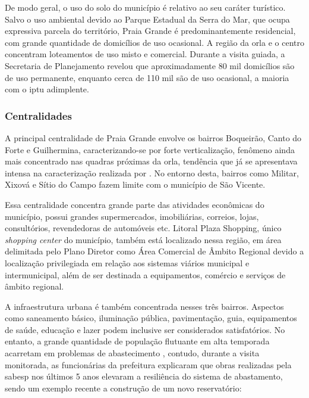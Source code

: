 	De modo geral, o uso do solo do município é relativo ao seu caráter turístico. Salvo o uso ambiental devido ao Parque Estadual da Serra do Mar, que ocupa expressiva parcela do território, Praia Grande é predominantemente residencial, com grande quantidade de domicílios de uso ocasional. A região da orla e o centro concentram loteamentos de uso misto e comercial. Durante a visita guiada, a Secretaria de Planejamento revelou que aproximadamente 80 mil domicílios são de uso permanente, enquanto cerca de 110 mil são de uso ocasional, a maioria com o \gls{iptu} adimplente.
	
	\subsubsection{Centralidades}
	A principal centralidade de Praia Grande envolve os bairros Boqueirão, Canto do Forte e Guilhermina, caracterizando-se por forte verticalização, fenômeno ainda mais concentrado nas quadras próximas da orla, tendência que já se apresentava intensa na caracterização realizada por \cite{agem2015a}. No entorno desta, bairros como Militar, Xixová e Sítio do Campo fazem limite com o município de São Vicente.
	
	Essa centralidade concentra grande parte das atividades econômicas do município, possui grandes supermercados, imobiliárias, correios, lojas, consultórios, revendedoras de automóveis etc. Litoral Plaza Shopping, único \textit{shopping center} do município, também está localizado nessa região, em área delimitada pelo Plano Diretor como Área Comercial de Âmbito Regional devido a localização privilegiada em relação aos sistemas viários municipal e intermunicipal, além de ser destinada a equipamentos, comércio e serviços de âmbito regional.
	
	A infraestrutura urbana é também concentrada nesses três bairros. Aspectos como saneamento básico, iluminação pública, pavimentação, guia, equipamentos de saúde, educação e lazer podem inclusive ser considerados satisfatórios. No entanto, a grande quantidade de população flutuante em alta temporada acarretam em problemas de abastecimento \cite{Lima2008a}, contudo, durante a visita monitorada, as funcionárias da prefeitura explicaram que obras realizadas pela \gls{sabesp} nos últimos 5 anos elevaram a resiliência do sistema de abastamento, sendo um exemplo recente a construção de um novo reservatório:
	
